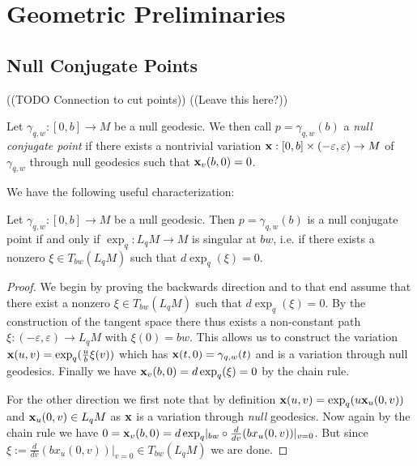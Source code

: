 \chapter{Geometric Preliminaries}

\section{Null Conjugate Points}
((TODO Connection to cut points))
((Leave this here?))
\begin{definition}
    Let $\gamma_{q,w}:[0,b]\to M$ be a null geodesic. We then call $p=\gamma_{q,w}(b)$ a \emph{null conjugate point} if there exists a nontrivial variation $\mathbf{x}:[0,b]\times(-\varepsilon,\varepsilon) \to M$ of $\gamma_{q,w}$ through null geodesics such that $\mathbf{x}_v(b,0)=0$.
\end{definition}

We have the following useful characterization:
\begin{proposition}
    Let $\gamma_{q,w}:[0,b]\to M$ be a null geodesic. Then $p=\gamma_{q,w}(b)$ is a null conjugate point if and only if $\exp_q:L_qM\to M$ is singular at $bw$, i.e. if there exists a nonzero $\xi\in T_{bw}(L_qM)$ such that $d\exp_q(\xi)=0$.
\end{proposition}
\begin{proof}
    We begin by proving the backwards direction and to that end assume that there exist a nonzero $\xi\in T_{bw}(L_qM)$ such that $d\exp_q(\xi)=0$. By the construction of the tangent space there thus exists a non-constant path $\xi:(-\varepsilon,\varepsilon)\to L_qM$ with $\xi(0)=bw$. This allows us to construct the variation $\mathbf{x}(u,v)=\exp_q(\frac{u}{b}\xi(v))$ which has $\mathbf{x}(t,0)=\gamma_{q,w}(t)$ and is a variation through null geodesics. Finally we have $\mathbf{x}_v(b,0)=d\exp_q(\xi)=0$ by the chain rule.

    For the other direction we first note that by definition $\mathbf{x}(u,v)=\exp_q(u\mathbf{x}_u(0,v))$ and $\mathbf{x}_u(0,v)\in L_qM$ as $\mathbf{x}$ is a variation through \emph{null} geodesics. 
    Now again by the chain rule we have $0=\mathbf{x}_v(b,0) = d\exp_q\rvert_{bw} \circ \frac{d}{dv}(bx_u(0,v))\rvert_{v=0}$. But since $\xi := \frac{d}{dv}(bx_u(0,v))\rvert_{v=0} \in T_{bw}(L_qM)$ we are done.
\end{proof}

